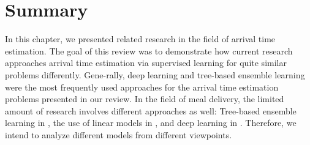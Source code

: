 \section{Summary}

In this chapter, we presented related research in the field of arrival time estimation. The goal of this review was to demonstrate how current research approaches arrival time estimation via supervised learning for quite similar problems differently. Gene-rally, deep learning and tree-based ensemble learning were the most frequently used approaches for the arrival time estimation problems presented in our review. In the field of meal delivery, the limited amount of research involves different approaches as well: Tree-based ensemble learning in \cite{Hildebrandt2020_EAT}, the use of linear models in \cite{Liu2018_LM_PLM}, and deep learning in \cite{Zhu2020_OFCTE_DL}. Therefore, we intend to analyze different models from different viewpoints. 